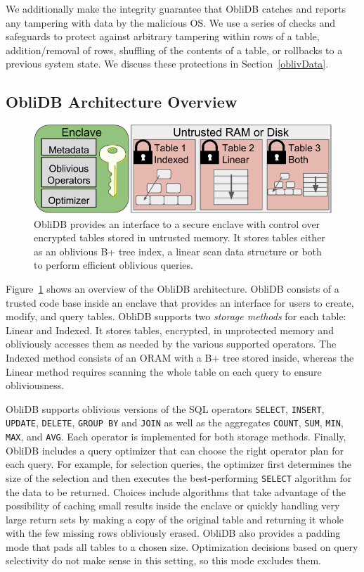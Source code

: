 \documentclass[letterpaper,twocolumn,10pt]{article}
\def\name/{ObliDB}
\begin{document}
We additionally make the integrity guarantee that \name/ catches and reports any tampering with data by the malicious OS. We use a series of checks and safeguards to protect against arbitrary tampering within rows of a table, addition/removal of rows, shuffling of the contents of a table, or rollbacks to a previous system state. We discuss these protections in Section~\ref{oblivData}.

\subsection{\name/ Architecture Overview}
\begin{figure}
\centering
\includegraphics[width=\linewidth]{figure_revised.pdf}
\caption{\small \name/ provides an interface to a secure enclave with control over encrypted tables stored in untrusted memory. It stores tables either as an oblivious B+ tree index, a linear scan data structure or both to perform efficient oblivious queries.}
\label{arch}
\end{figure}
Figure~\ref{arch} shows an overview of the \name/ architecture. \name/ consists of a trusted code base inside an enclave that provides an interface for users to create, modify, and query tables. \name/ supports two \emph{storage methods} for each table: Linear and Indexed. It stores tables, encrypted, in unprotected memory and obliviously accesses them as needed by the various supported operators. The Indexed method consists of an ORAM with a B+ tree stored inside, whereas the Linear method requires scanning the whole table on each query to ensure obliviousness.

  \name/ supports oblivious versions of the SQL operators \texttt{SELECT}, \texttt{INSERT}, \texttt{UPDATE}, \texttt{DELETE}, \texttt{GROUP BY} and \texttt{JOIN} as well as the aggregates \texttt{COUNT}, \texttt{SUM}, \texttt{MIN}, \texttt{MAX}, and \texttt{AVG}. Each operator is implemented for both storage methods. Finally, ObliDB includes a query optimizer that can choose the right operator plan for each query. For example, for selection queries, the optimizer first determines the size of the selection and then executes the best-performing \texttt{SELECT} algorithm for the data to be returned. Choices include algorithms that take advantage of the possibility of caching small results inside the enclave or quickly handling very large return sets by making a copy of the original table and returning it whole with the few missing rows obliviously erased. \name/ also provides a padding mode that pads all tables to a chosen size. Optimization decisions based on query selectivity do not make sense in this setting, so this mode excludes them.
\end{document}
